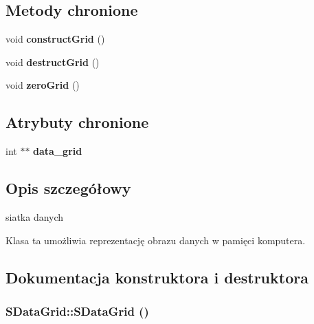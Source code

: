 \subsection*{Metody chronione}
\begin{CompactItemize}
\item 
\hypertarget{classSDataGrid_5af888335764c1ba959b6ef964223b6d}{
void \textbf{constructGrid} ()}
\label{classSDataGrid_5af888335764c1ba959b6ef964223b6d}

\item 
\hypertarget{classSDataGrid_c9c0ef298fb96c56f9f9796720a41489}{
void \textbf{destructGrid} ()}
\label{classSDataGrid_c9c0ef298fb96c56f9f9796720a41489}

\item 
\hypertarget{classSDataGrid_df36584ac2e2d38eda1bd06ad8fad355}{
void \textbf{zeroGrid} ()}
\label{classSDataGrid_df36584ac2e2d38eda1bd06ad8fad355}

\end{CompactItemize}
\subsection*{Atrybuty chronione}
\begin{CompactItemize}
\item 
\hypertarget{classSDataGrid_6401d181afc8b06f75fcec860b02e9cb}{
int $\ast$$\ast$ \textbf{data\_\-grid}}
\label{classSDataGrid_6401d181afc8b06f75fcec860b02e9cb}

\end{CompactItemize}


\subsection{Opis szczegółowy}
siatka danych 

Klasa ta umożliwia reprezentację obrazu danych w pamięci komputera. 

\subsection{Dokumentacja konstruktora i destruktora}
\hypertarget{classSDataGrid_741ea12ba0eec8c00fec30c8730f2192}{
\subsubsection[{SDataGrid}]{\setlength{\rightskip}{0pt plus 5cm}SDataGrid::SDataGrid ()}}
\label{classSDataGrid_741ea12ba0eec8c00fec30c8730f2192}


